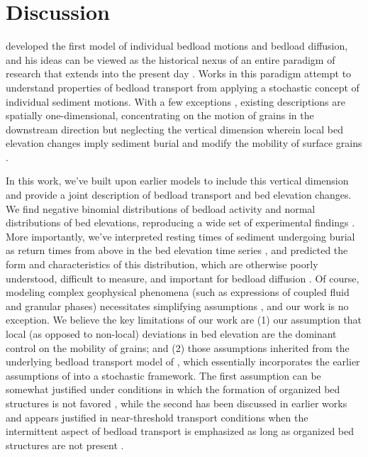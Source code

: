 \documentclass[draft]{agujournal2018}
\begin{document}
\section{Discussion}

\citet{Einstein1937} developed the first model of individual bedload motions and bedload diffusion, and his ideas can be viewed as the historical nexus of an entire paradigm of research that extends into the present day \citep[e.g.][]{Hubbell1964, Nakagawa1976,Hassan1991,Ancey2008, Wu2019}.
Works in this paradigm attempt to understand properties of bedload transport from applying a stochastic concept of individual sediment motions.
With a few exceptions \citep[e.g.][]{Yang1971,Nakagawa1980,Wu2019}, existing descriptions are spatially one-dimensional, concentrating on the motion of grains in the downstream direction but neglecting the vertical dimension wherein local bed elevation changes imply sediment burial \citep[e.g.][]{Voepel2013,Martin2014} and modify the mobility of surface grains \citep[e.g.][]{Yang1971,Nakagawa1980}.

In this work, we've built upon earlier models \citep[e.g.][]{Ancey2008,Martin2014} to include this vertical dimension and provide a joint description of bedload transport and bed elevation changes.
We find negative binomial distributions of bedload activity and normal distributions of bed elevations, reproducing a wide set of experimental findings \citep{Ancey2008, Heyman2016, Wong2007, Singh2009, Martin2014}.
More importantly, we've interpreted resting times of sediment undergoing burial as return times from above in the bed elevation time series \citep[e.g.][]{Voepel2013,Martin2014}, and predicted the form and characteristics of this distribution, which are otherwise poorly understood, difficult to measure, and important for bedload diffusion \citep[e.g.][]{Voepel2013,Martin2014,Bradley2017}.
Of course, modeling complex geophysical phenomena (such as expressions of coupled fluid and granular phases) necessitates simplifying assumptions \citep[e.g.][]{Larsen2016}, and our work is no exception.
We believe the key limitations of our work are (1) our assumption that local (as opposed to non-local) deviations in bed elevation are the dominant control on the mobility of grains; and (2) those assumptions inherited from the underlying bedload transport model of \citet{Ancey2008}, which essentially incorporates the earlier assumptions of \citet{Einstein1950} into a stochastic framework.
The first assumption can be somewhat justified under conditions in which the formation of organized bed structures is not favored \citep[e.g.][]{Hassan2008}, while the second has been discussed in earlier works and appears justified in near-threshold transport conditions when the intermittent aspect of bedload transport is emphasized \citep[e.g.][]{Ancey2008} as long as organized bed structures are not present \citep[e.g.][]{Dhont2018}.
\end{document}
